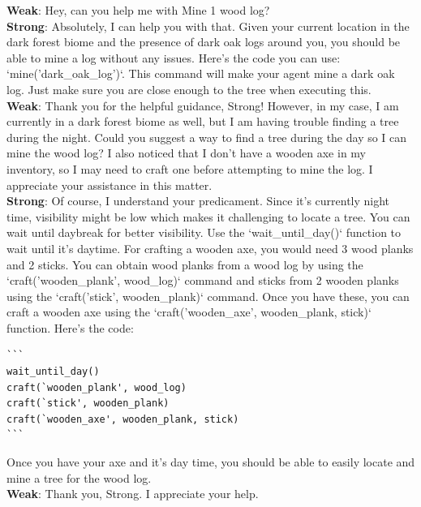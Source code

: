 \begin{tcolorbox}[title=Conversation about completing the task: "Mine 1 wood log"]

\textbf{Weak}: Hey, can you help me with Mine 1 wood log? \\

\textbf{Strong}: Absolutely, I can help you with that. Given your current location in the dark forest biome and the presence of dark oak logs around you, you should be able to mine a log without any issues. Here's the code you can use: `mine('dark\_oak\_log')`. This command will make your agent mine a dark oak log. Just make sure you are close enough to the tree when executing this. \\

\textbf{Weak}:  Thank you for the helpful guidance, Strong! However, in my case, I am currently in a dark forest biome as well, but I am having trouble finding a tree during the night. Could you suggest a way to find a tree during the day so I can mine the wood log? I also noticed that I don't have a wooden axe in my inventory, so I may need to craft one before attempting to mine the log. I appreciate your assistance in this matter. \\

\textbf{Strong}: Of course, I understand your predicament. Since it's currently night time, visibility might be low which makes it challenging to locate a tree. You can wait until daybreak for better visibility. Use the `wait\_until\_day()` function to wait until it's daytime. For crafting a wooden axe, you would need 3 wood planks and 2 sticks. You can obtain wood planks from a wood log by using the `craft('wooden\_plank', wood\_log)` command and sticks from 2 wooden planks using the `craft('stick', wooden\_plank)` command. Once you have these, you can craft a wooden axe using the `craft('wooden\_axe', wooden\_plank, stick)` function. Here's the code:

\begin{verbatim}
```
wait_until_day()
craft(`wooden_plank', wood_log)
craft(`stick', wooden_plank)
craft(`wooden_axe', wooden_plank, stick)
```
\end{verbatim}


Once you have your axe and it's day time, you should be able to easily locate and mine a tree for the wood log. \\ 

\textbf{Weak}:  Thank you, Strong. I appreciate your help.


                            
\end{tcolorbox}

